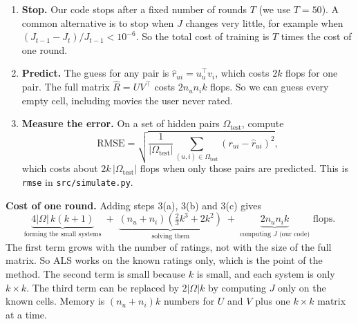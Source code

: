 \begin{enumerate}
\begin{enumerate}
    \item \textbf{Update every movie, with $U$ fixed.} For each movie $i = 1, \dots, n_i$, do the same four steps with the roles swapped: take $U_i$ and $r_i$, form $U_i^\top U_i + \lambda I_k$ and $U_i^\top r_i$, solve for $v_i$ and store it as row $i$ of $V$. This step uses the new $U$ from step 3(a). So this step costs about
    \[
    2|\Omega|\,k(k+1) + n_i\left(\tfrac{2}{3}k^3 + 2k^2\right) \text{ flops.}
    \]

    \item \textbf{Record the objective.} Compute $J_t = J(U,V)$ as in step 2. By Question~4, $J_t \le J_{t-1}$, so this list is also a check on the code: if $J$ ever goes up, there is a bug.
  \end{enumerate}

  \item \textbf{Stop.} Our code stops after a fixed number of rounds $T$ (we use $T = 50$). A common alternative is to stop when $J$ changes very little, for example when $(J_{t-1} - J_t)/J_{t-1} < 10^{-6}$. So the total cost of training is $T$ times the cost of one round.

  \item \textbf{Predict.} The guess for any pair is $\hat r_{ui} = u_u^\top v_i$, which costs $2k$ flops for one pair. The full matrix $\hat R = UV^\top$ costs $2n_u n_i k$ flops. So we can guess every empty cell, including movies the user never rated.

  \item \textbf{Measure the error.} On a set of hidden pairs $\Omega_{\text{test}}$, compute
  \[
  \text{RMSE} = \sqrt{\frac{1}{|\Omega_{\text{test}}|}\sum_{(u,i)\in\Omega_{\text{test}}} \left(r_{ui} - \hat r_{ui}\right)^2 },
  \]
  which costs about $2k\,|\Omega_{\text{test}}|$ flops when only those pairs are predicted. This is \texttt{rmse} in \texttt{src/simulate.py}.
\end{enumerate}

\textbf{Cost of one round.} Adding steps 3(a), 3(b) and 3(c) gives
\[
\underbrace{4|\Omega|\,k(k+1)}_{\text{forming the small systems}} \;+\; \underbrace{(n_u + n_i)\left(\tfrac{2}{3}k^3 + 2k^2\right)}_{\text{solving them}} \;+\; \underbrace{2 n_u n_i k}_{\text{computing } J \text{ (our code)}} \text{ flops.}
\]
The first term grows with the number of ratings, not with the size of the full matrix. So ALS works on the known ratings only, which is the point of the method. The second term is small because $k$ is small, and each system is only $k \times k$. The third term can be replaced by $2|\Omega|k$ by computing $J$ only on the known cells. Memory is $(n_u + n_i)k$ numbers for $U$ and $V$ plus one $k \times k$ matrix at a time.

